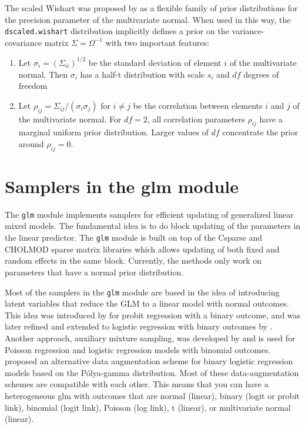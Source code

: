 \documentclass[11pt, a4paper, titlepage]{report}
\begin{document}
{The scaled Wishart was proposed by \citet{HuangWand2013} as a flexible
family of prior distributions for the precision parameter of the
multivariate normal. When used in this way, the
\texttt{dscaled.wishart} distribution implicitly defines a prior on
the variance-covariance matrix $\Sigma = \Omega^{-1}$ with two
important features:
\begin{enumerate}
\item Let $\sigma_i = (\Sigma_{ii})^{1/2}$ be the standard deviation of
  element $i$ of the multivariate normal. Then $\sigma_i$ has a
  half-t distribution with scale $s_i$ and $df$ degrees of freedom
\item Let $\rho_{ij} = \Sigma_{ij}/(\sigma_i \sigma_j)$ for $i \neq j$
  be the correlation between elements $i$ and $j$ of the multivariate
  normal. For $df=2$, all correlation parameters $\rho_{ij}$ have a
  marginal uniform prior distribution. Larger values of $df$
  concentrate the prior around $\rho_{ij} = 0$.
\end{enumerate}


\section{Samplers in the glm module}
\label{section:glm::samplers}

The \texttt{glm} module implements samplers for efficient updating of
generalized linear mixed models.  The fundamental idea is to do block
updating of the parameters in the linear predictor.  The \texttt{glm}
module is built on top of the \textsf{Csparse} and \textsf{CHOLMOD}
sparse matrix libraries \citep{Davis2006, Davis1999} which allows
updating of both fixed and random effects in the same
block. Currently, the methods only work on parameters that have a
normal prior distribution.

Most of the samplers in the \texttt{glm} module are based in the idea
of introducing latent variables that reduce the GLM to a linear model
with normal outcomes. This idea was introduced by \citet{AlbertChib93}
for probit regression with a binary outcome, and was later refined and
extended to logistic regression with binary outcomes by
\citet{HolmesHeld06}. Another approach, auxiliary mixture sampling,
was developed by \citet{Fruhwirth-Schnatter09} and is used for Poisson
regression and logistic regression models with binomial outcomes.
\citet{PolsonEtal2013} proposed an alternative data augmentation
scheme for binary logistic regression models based on the
P\'{o}lya-gamma distribution. Most of these data-augmentation schemes
are compatible with each other. This means that you can have a
heterogeneous glm with outcomes that are normal (linear), binary
(logit or probit link), binomial (logit link), Poisson (log link),
t (linear), or multivariate normal (linear).

}
\end{document}
